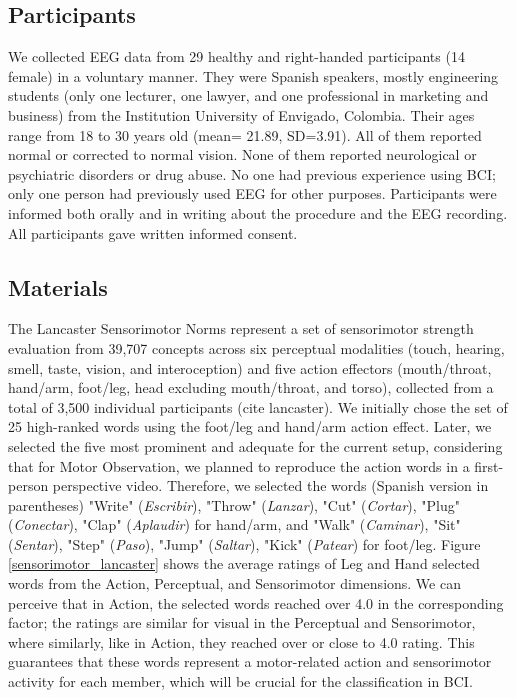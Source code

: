 \documentclass[10pt,letterpaper]{article}
\begin{document}
\subsection*{Participants}
We collected EEG data from 29 healthy and right-handed participants (14 female) in a voluntary manner. They were Spanish speakers, mostly engineering students (only one lecturer, one lawyer, and one professional in marketing and business) from the Institution University of Envigado, Colombia. Their ages range from 18 to 30 years old (mean= 21.89, SD=3.91). All of them reported normal or corrected to normal vision. None of them reported neurological or psychiatric disorders or drug abuse. No one had previous experience using BCI; only one person had previously used EEG for other purposes. Participants were informed both orally and in writing about the procedure and the EEG recording. All participants gave written informed consent.

\subsection*{Materials}

The Lancaster Sensorimotor Norms represent a set of sensorimotor strength evaluation from 39,707 concepts across six perceptual modalities (touch, hearing, smell, taste, vision, and interoception) and five action effectors (mouth/throat, hand/arm, foot/leg, head excluding mouth/throat, and torso), collected from a total of 3,500 individual participants (cite lancaster). We initially chose the set of 25 high-ranked words using the foot/leg and hand/arm action effect. Later, we selected the five most prominent and adequate for the current setup, considering that for Motor Observation, we planned to reproduce the action words in a first-person perspective video. Therefore, we selected the words (Spanish version in parentheses)  "Write" (\textit{Escribir}), "Throw" (\textit{Lanzar}), "Cut" (\textit{Cortar}), "Plug" (\textit{Conectar}), "Clap" (\textit{Aplaudir}) for hand/arm, and  "Walk" (\textit{Caminar}), "Sit" (\textit{Sentar}), "Step" (\textit{Paso}), "Jump" (\textit{Saltar}), "Kick" (\textit{Patear}) for foot/leg. Figure \ref{sensorimotor_lancaster} shows the average ratings of Leg and Hand selected words from the Action, Perceptual, and Sensorimotor dimensions. We can perceive that in Action, the selected words reached over 4.0 in the corresponding factor; the ratings are similar for visual in the Perceptual and Sensorimotor, where similarly, like in Action, they reached over or close to 4.0 rating. This guarantees that these words represent a motor-related action and sensorimotor activity for each member, which will be crucial for the classification in BCI. 
\end{document}
